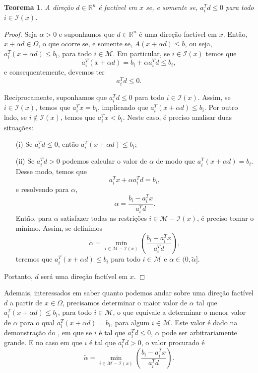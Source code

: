 \documentclass[12pt,a4paper]{scrartcl}
\def\RR{\mathds{R}}
\newtheorem{teo}{Teorema}
\theoremstyle{definition}%
\begin{document}
\begin{teo} \label{teo:direcoes_factiveis_restricao_desigualdade}
A direção $d \in \RR^{n}$ é factível em $x$ se, e somente se, $a_{i}^{T}d \leq 0$ para todo $i \in \mathcal{I} (x)$.
\end{teo}
\begin{proof}
Seja $\alpha >0$ e suponhamos que $d\in \RR^{n}$ é uma direção factível em $x$. Então, $x+\alpha d \in \Omega$, o que ocorre se, e somente se, $A(x+\alpha d) \leq b$, ou seja, $a_{i}^{T}(x+\alpha d) \leq b_{i}$, para todo $i \in \mathcal{M}$. 
Em particular, se $i\in \mathcal{I} (x)$ temos que
\[
a_{i}^{T}(x+\alpha d) = b_{i} + \alpha a_{i}^{T}d \leq b_{i},
\]
e consequentemente, devemos ter
\[
a_{i}^{T}d \leq 0.
\]

Reciprocamente, suponhamos que $a_{i}^{T}d \leq 0$ para todo $i \in \mathcal{I} (x)$. Assim, se $i \in \mathcal{I} (x)$, temos que $a_{i}^{T} x = b_{i}$, implicando que $a_{i}^{T}(x+\alpha d) \leq b_{i}$.
Por outro lado, se $i \notin \mathcal{I}(x)$, temos que $a_{i}^{T} x < b_{i}$. Neste caso, é preciso analisar duas situações:
\begin{enumerate}
	\item[(i)] Se $a_{i}^{T}d \leq 0$, então $a_{i}^{T}(x + \alpha d) \leq b_{i}$;

	\item[(ii)]Se $a_{i}^{T}d >0$ podemos calcular o valor de $\alpha$ de modo que $a_{i}^{T}(x+\alpha d) = b_{i}$. Desse modo, temos que
	\[
	a_{i}^{T}x + \alpha a_{i}^{T}d = b_{i} ,
	\]
	e resolvendo para $\alpha$,
	\[
	\alpha = \dfrac{b_{i} - a_{i}^{T}x}{a_{i}^{T}d}.
	\]
	Então, para $\alpha$ satisfazer todas as restrições $i \in \mathcal{M}-\mathcal{I}(x)$, é preciso tomar o mínimo. Assim, se definimos
	\[
	\tilde{\alpha} = \min_{i \in \mathcal{M}-\mathcal{I}(x) } \left( \dfrac{b_{i} - a_{i}^{T}x}{a_{i}^{T}d} \right) ,
	\]
	teremos que $a_{i}^{T}(x + \alpha d) \leq b_{i}$ para todo $i \in \mathcal{M}$ e $\alpha \in (0,\tilde{\alpha} ]$. 
\end{enumerate}	
Portanto, $d$ será uma direção factível em $x$.
\end{proof}

Ademais, interessados em saber quanto podemos andar sobre uma direção factível $d$ a partir de $x \in \Omega$, precisamos determinar o maior valor de $\alpha$ tal que $a_{i}^{T}(x + \alpha d) \leq b_{i}$, para todo $i\in \mathcal{M}$, o que equivale a determinar o menor valor de $\alpha$ para o qual $a_{i}^{T}(x+\alpha d) = b_{i}$, para algum $i\in \mathcal{M}$. Este valor é dado na demonstração do , em que se $i$ é tal que $a_{i}^{T}d \leq 0$, $\alpha$ pode ser arbitrariamente grande. E no caso em que $i$ é tal que $a_{i}^{T}d >0$, o valor procurado é
\[
\tilde{\alpha} = \min_{i \in \mathcal{M}-\mathcal{I}(x) } \left( \dfrac{b_{i} - a_{i}^{T}x}{a_{i}^{T}d} \right) .
\]
\end{document}
